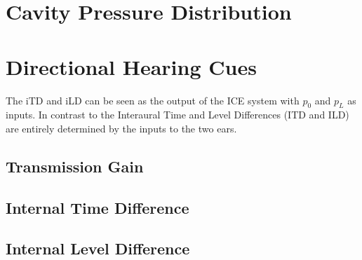 
\section{Cavity Pressure Distribution}\label{pressuredistchapter}

\section{Directional Hearing Cues}\label{hearingcueschapter}
The iTD and iLD can be seen as the output of the ICE system with $p_0$ and $p_L$ as inputs.
In contrast to the Interaural Time and Level Differences (ITD and ILD) are
entirely determined by the inputs to the two ears.

\subsection{Transmission Gain}

\subsection{Internal Time Difference}

\subsection{Internal Level Difference}